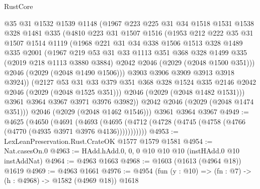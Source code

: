 \begin{lexlean}{RustCore}
\begin{coremodule}
            @35
            @31
            @1532
            @1539
            @1148
            (@1967
              @223
              @225
              @31
              @34
              @1518
              @1531
              @1538
              @328
              @1481
              @335
              (@4810
                @223
                @31
                @1507
                @1516
                (@1953
                  @212
                  @222
                  @35
                  @31
                  @1507
                  @1514
                  @1119
                  (@1968
                    @221
                    @31
                    @34
                    @338
                    @1506
                    @1513
                    @328
                    @1489
                    @335
                    @2001
                    (@1967
                      @219
                      @53
                      @31
                      @33
                      @1113
                      @351
                      @368
                      @328
                      @1499
                      @335
                      (@2019 @218 @1113 @3880 @3884)
                      @2042
                      @2046
                      (@2029 (@2048 @1500 @351)))
                    @2046
                    (@2029 (@2048 @1490 @1506)))
                  @3903
                  @3906
                  @3909
                  @3913
                  @3918
                  @3924))
              (@2127
                @53
                @31
                @33
                @379
                @351
                @368
                @328
                @1524
                @335
                @2146
                @2042
                @2046
                (@2029 (@2048 @1525 @351)))
              @2046
              (@2029 (@2048 @1482 @1531)))
            @3961
            @3964
            @3967
            @3971
            @3976
            @3982))
        @2042
        @2046
        (@2029 (@2048 @1474 @351)))
      @2046
      (@2029 (@2048 @1462 @1546)))
    @3961
    @3964
    @3967
@4949 := @4625
    (@4650
      (@4691
        (@4693 (@4695 (@4712 (@4728 (@4745 (@4758 (@4766 (@4770 (@4935 @3971 @3976 @4136)))))))))))
@4953 := LexLeanPreservation.Rust.CrateOK @1577 @1579 @1581
@4954 := Nat.casesOn.{0}
@4963 := HAdd.hAdd.{0, 0, 0} @10 @10 @10 (instHAdd.{0} @10 instAddNat)
@4964 := @4963 @1663
@4968 := @1603 (@1613 (@4964 @18)) @1619
@4969 := @4963 @1661
@4976 := @4954 (fun (y : @10) => (fn : @7) -> (h : @4968) -> @1582 (@4969 @18)) @1618

\end{coremodule}
\end{lexlean}
